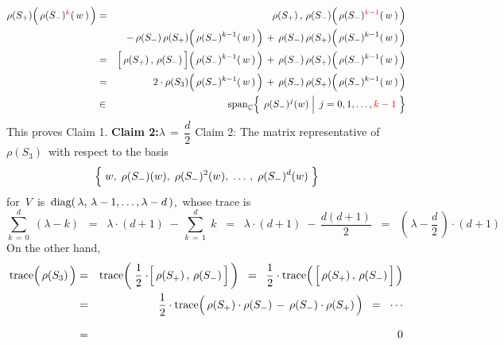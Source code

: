 \begin{eqnarray*}
\rho(S_{+})\!\left(\,\overset{{\color{white}1}}{\rho}(S_{-})^{{\color{red}k}}(\,w\,)\,\right)
& = &
	\rho(S_{+})\,,\,\rho(S_{-})\!\left(\,\overset{{\color{white}1}}{\rho}(S_{-})^{{\color{red}k-1}}(\,w\,)\,\right)
\\
&&
	\, - \,
	\rho(S_{-})\,\rho(S_{+})\!\left(\,\overset{{\color{white}1}}{\rho}(S_{-})^{k-1}(\,w\,)\,\right)
	\, + \,
	\rho(S_{-})\,\rho(S_{+})\!\left(\,\overset{{\color{white}1}}{\rho}(S_{-})^{k-1}(\,w\,)\,\right)
\\
& = &
	\left[\,\overset{{\color{white}1}}{\rho}(S_{+})\,,\,\rho(S_{-})\,\right]
	\!\left(\,\overset{{\color{white}1}}{\rho}(S_{-})^{k-1}(\,w\,)\,\right)
	\, + \,
	\rho(S_{-})\,\rho(S_{+})\!\left(\,\overset{{\color{white}1}}{\rho}(S_{-})^{k-1}(\,w\,)\,\right)
\\
& = &
	2 \cdot \rho(S_{3})\!\left(\,\overset{{\color{white}1}}{\rho}(S_{-})^{k-1}(\,w\,)\,\right)
	\, + \,
	\rho(S_{-})\,\rho(S_{+})\!\left(\,\overset{{\color{white}1}}{\rho}(S_{-})^{k-1}(\,w\,)\,\right)
\\
& \in &
	\span_{\C}\!\left\{\;
		\left.
		\overset{{\color{white}1}}{\rho}(S_{-})^{j}(w)
		\;\right\vert\;
		j = 0, 1, \ldots, {\color{red}k - 1}
		\;\right\}
\end{eqnarray*}
This proves Claim 1.
\vskip 0.5cm
\noindent
\textbf{Claim 2:}\quad $\lambda \,=\, \dfrac{d}{2}$
\vskip 0.1cm
\noindent
\proofof Claim 2:\quad
The matrix representative of \,$\rho(S_{3})$\, with respect to the basis\\
\begin{equation*}
\left\{\;
	\overset{{\color{white}1}}{w},\; \rho(S_{-})(w),\; \rho(S_{-})^{2}(w),\; \ldots\,,\; \rho(S_{-})^{d}(w)
	\;\right\}
\end{equation*}
for \,$V$\, is
\,$\textnormal{diag}(\,\lambda,\,\lambda-1,\ldots,\lambda - d\,)$,\,
whose trace is
\begin{equation*}
\overset{d}{\underset{k\,=\,0}{\sum}}\;(\lambda - k)
\;\; = \;\;
	\lambda\cdot(d+1) \;-\, \overset{d}{\underset{k\,=\,1}{\sum}}\;k
\;\; = \;\;
	\lambda\cdot(d+1) \;-\, \dfrac{d(d+1)}{2}
\;\; = \;\;
	\left(\,\lambda - \dfrac{d}{2}\,\right)\cdot(d+1)
\end{equation*}
On the other hand,
\begin{eqnarray*}
\trace\!\left(\,\overset{{\color{white}1}}{\rho}(S_{3})\,\right)
& = &
	\trace\!\left(\;\dfrac{1}{2}\cdot\!\left[\,\overset{{\color{white}1}}{\rho}(S_{+})\,,\,\rho(S_{-})\,\right]\,\right)
\;\; = \;\;
	\dfrac{1}{2}\cdot\trace\!\left(\,\left[\,\overset{{\color{white}1}}{\rho}(S_{+})\,,\,\rho(S_{-})\,\right]\,\right)
\\
& = &
	\dfrac{1}{2}\cdot\trace\!\left(\,
		\overset{{\color{white}1}}{\rho}(S_{+})\cdot\rho(S_{-})
		\, - \,
		\overset{{\color{white}1}}{\rho}(S_{-})\cdot\rho(S_{+})
		\,\right)
\;\; = \;\;
	\cdots
\\
& \overset{{\color{white}\textnormal{\Large$1$}}}{=} &
	0
\end{eqnarray*}
